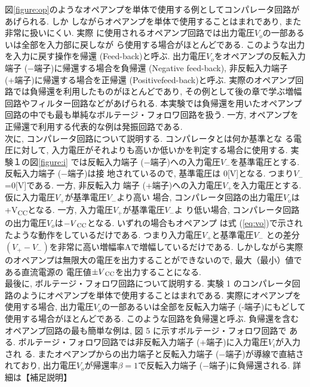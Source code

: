 \documentclass[uplatex,a4paper,11pt,dvipdfmxs]{jsarticle}
\begin{document}
\begin{enumerate}
    \quad 図\ref{figure:op}のようなオペアンプを単体で使用する例としてコンパレータ回路があげられる. しか
    しながらオペアンプを単体で使用することはまれであり, また非常に扱いにくい. 実際
    に使用されるオペアンプ回路では出力電圧\(V_o\)の一部あるいは全部を入力部に戻しなが
    ら使用する場合がほとんどである. このような出力を入力に戻す操作を帰還 (Feed-back)と呼ぶ. 出力電圧\(V_o\)をオペアンプの反転入力
    端子 (\(-\)端子)に帰還する場合を負帰還 (Negative feed-back), 非反転入力端子 (+端子)に帰還する場合を正帰還 (Positivefeed-back)と呼ぶ. 
    実際のオペアンプ回路では負帰還を利用したものがほとんどであり, その例として後の章で学ぶ増幅回路やフィルター回路などがあげられる. 
    本実験では負帰還を用いたオペアンプ回路の中でも最も単純なボルテージ・フォロワ回路を扱う. 
    一方, オペアンプを正帰還で利用する代表的な例は発振回路である. \\
    \quad 次に, コンパレータ回路について説明する. コンパレータとは何か基準とな
    る電圧に対して, 入力電圧がそれよりも高いか低いかを判定する場合に使用する. 実験１の図\ref{figure:i}
    では反転入力端子 (\(-\)端子)への入力電圧\(V_-\)を基準電圧とする. 反転入力端子 (\(-\)端子)は接
    地されているので, 基準電圧は 0[V]となる. つまり\(V_-\)=0[V]である. 一方, 非反転入力
    端子 (+端子)への入力電圧\(V_+\)を入力電圧とする. 仮に入力電圧\(V_+\)が基準電圧\(V_-\)より高い
    場合, コンパレータ回路の出力電圧\(V_o\)は+V\textsubscript{CC}となる. 一方, 入力電圧\(V_+\)が基準電圧\(V_-\)よ
    り低い場合, コンパレータ回路の出力電圧\(V_o\)は\(-V\textsubscript{CC}\)となる. いずれの場合もオペアンプ
    は式 (\ref{eq:vo})で示されたような動作をしているだけである. つまり入力電圧\(V_+\)と基準電圧\(V_-\)
    との差分\((V_+-V_-)\)を非常に高い増幅率Aで増幅しているだけである. しかしながら実際
    のオペアンプは無限大の電圧を出力することができないので, 最大（最小）値である直流電源の
    電圧値\(\pm V\textsubscript{CC}\)を出力することになる. \\
    \quad 最後に, ボルテージ・フォロワ回路について説明する. 実験 1 のコンパレータ回路のようにオペアンプを単体で使用することはまれである. 
    実際にオペアンプを使用する場合, 出力電圧\(V_o\)の一部あるいは全部を反転入力端子 (-端子)にもどして使用する場合がほとんどである. 
    このような回路を負帰還と呼ぶ. 負帰還を含むオペアンプ回路の最も簡単な例は, 図 5 に示すボルテージ・フォロワ回路で
    ある. ボルテージ・フォロワ回路では非反転入力端子 (+端子)に入力電圧\(V_i\)が入力され
    る. またオペアンプからの出力端子と反転入力端子 (\(-\)端子)が導線で直結されており, 
    出力電圧\(V_o\)が帰還率\(\beta =1\)で反転入力端子 (\(-\)端子)に負帰還される. 詳細は【補足説明】

\end{enumerate}
\end{document}
